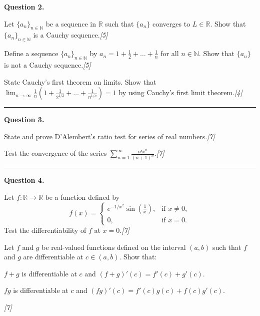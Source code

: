 \documentclass[11pt,a4paper]{article}
\newcommand{\pts}[1]{\hfill\textit{[#1]}}
\begin{document}
{\noindent\textbf{Question 2.}
\begin{parts}
  \item Let $\{a_n\}_{n \in \mathbb{N}}$ be a sequence in $\mathbb{R}$ such that $\{a_n\}$ converges to $L \in \mathbb{R}$. Show that $\{a_n\}_{n \in \mathbb{N}}$ is a Cauchy sequence.\pts{5}
  \item Define a sequence $\{a_n\}_{n \in \mathbb{N}}$ by $a_n = 1 + \frac{1}{2} + \dots + \frac{1}{n}$ for all $n \in \mathbb{N}$. Show that $\{a_n\}$ is not a Cauchy sequence.\pts{5}
  \item State Cauchy's first theorem on limits. Show that $\lim_{n \to \infty} \frac{1}{n} \left( 1 + \frac{1}{2^{1/2}} + \dots + \frac{1}{n^{1/n}} \right) = 1$ by using Cauchy's first limit theorem.\pts{4}
\end{parts}

\medskip\rule{\linewidth}{0.2pt}\medskip

\noindent\textbf{Question 3.}
\begin{parts}
  \item State and prove D'Alembert's ratio test for series of real numbers.\pts{7}
  \item Test the convergence of the series $\sum_{n=1}^\infty \frac{n! x^n}{(n+1)^n}$.\pts{7}
\end{parts}

\medskip\rule{\linewidth}{0.2pt}\medskip

\noindent\textbf{Question 4.}
\begin{parts}
  \item Let $f \colon \mathbb{R} \to \mathbb{R}$ be a function defined by
  \[
    f(x) = \begin{cases} e^{-1/x^2} \sin\left(\frac{1}{x}\right), & \text{if } x \neq 0, \\ 0, & \text{if } x = 0. \end{cases}
  \]
  Test the differentiability of $f$ at $x = 0$.\pts{7}
  \item Let $f$ and $g$ be real-valued functions defined on the interval $(a, b)$ such that $f$ and $g$ are differentiable at $c \in (a, b)$. Show that:
  \begin{parts}
    \item $f + g$ is differentiable at $c$ and $(f+g)'(c) = f'(c) + g'(c)$.
    \item $fg$ is differentiable at $c$ and $(fg)'(c) = f'(c)g(c) + f(c)g'(c)$.
  \end{parts}\pts{7}
\end{parts}

}
\end{document}
